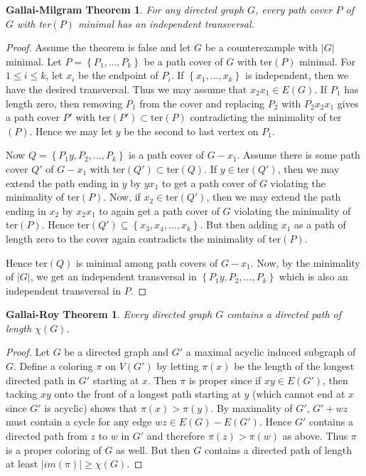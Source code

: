 \documentclass[12pt]{article}
\theoremstyle{plain}
\newtheorem*{GallaiMilgram}{Gallai-Milgram Theorem}
\newtheorem*{GallaiRoy}{Gallai-Roy Theorem}
\theoremstyle{definition}
\theoremstyle{remark}
\newcommand{\set}[1]{\left\{ #1 \right\}}
\newcommand{\card}[1]{\left|#1\right|}
\begin{document}
\begin{GallaiMilgram}
For any directed graph $G$, every path cover $P$ of $G$ with ter$(P)$ minimal has an independent transversal.
\end{GallaiMilgram}
\begin{proof}
Assume the theorem is false and let $G$ be a counterexample with $\card{G}$ minimal. Let $P = \set{P_1, \ldots, P_k}$ be a path cover of $G$ with ter$(P)$ minimal.  For $1 \leq i \leq k$, let $x_i$ be the endpoint of $P_i$.  If $\set{x_1, \ldots, x_k}$ is independent, then we have the desired transversal.  Thus we may assume that $x_2x_1 \in E(G)$.  If $P_1$ has length zero, then removing $P_1$ from the cover and replacing $P_2$ with $P_2x_2x_1$ gives a path cover $P'$ with ter$(P') \subset \text{ter}(P)$ contradicting the minimality of ter$(P)$.  Hence we may let $y$ be the second to last vertex on $P_1$.

Now $Q = \set{P_1y, P_2, \ldots, P_k}$ is a path cover of $G-x_1$.  Assume there is some path cover $Q'$ of $G-x_1$ with ter$(Q') \subset \text{ter}(Q)$.  If $y \in \text{ter}(Q')$, then we may extend the path ending in $y$ by $yx_1$ to get a path cover of $G$ violating the minimality of ter$(P)$.  Now, if $x_2 \in \text{ter}(Q')$, then we may extend the path ending in $x_2$ by $x_2x_1$ to again get a path cover of $G$ violating the minimality of ter$(P)$.  Hence ter$(Q') \subseteq \set{x_3, x_4, \ldots, x_k}$.  But then adding $x_1$ as a path of length zero to the cover again contradicts the minimality of ter$(P)$. 

Hence ter$(Q)$ is minimal among path covers of $G-x_1$.  Now, by the minimality of $\card{G}$, we get an independent transversal in $\set{P_1y, P_2, \ldots, P_k}$ which is also an independent transversal in $P$.
\end{proof}


\begin{GallaiRoy}
Every directed graph $G$ contains a directed path of length $\chi(G)$.
\end{GallaiRoy}
\begin{proof}
Let $G$ be a directed graph and $G'$ a maximal acyclic induced
subgraph of $G$.  Define a coloring $\pi$ on $V(G')$ by letting
$\pi(x)$ be the length of the longest directed path in $G'$ starting
at $x$. Then $\pi$ is proper since if $xy \in E(G')$, then tacking
$xy$ onto the front of a longest path starting at $y$ (which cannot
end at $x$ since $G'$ is acyclic) shows that $\pi(x) > \pi(y)$.  By
maximality of $G'$, $G' + wz$ must contain a cycle for any edge $wz
\in E(G) - E(G')$.  Hence $G'$ contains a directed path from $z$ to
$w$ in $G'$ and therefore $\pi(z) > \pi(w)$ as above.  Thus $\pi$ is a
proper coloring of $G$ as well.  But then $G$ contains a directed path
of length at least $\card{im(\pi)} \geq \chi(G)$.
\end{proof}
\end{document}
